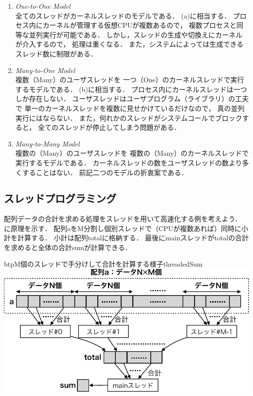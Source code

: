 \begin{enumerate}
\item \emph{One-to-One Model} \\
  全てのスレッドがカーネルスレッドのモデルである．
  (a)に相当する．
  プロセス内にカーネルが管理する仮想CPUが複数あるので，
  複数プロセスと同等な並列実行が可能である．
  しかし，スレッドの生成や切換えにカーネルが介入するので，
  処理は重くなる．
  また，システムによっては生成できるスレッド数に制限がある．
\item \emph{Many-to-One Model} \\
  複数（Many）のユーザスレッドを
  一つ（One）のカーネルスレッドで実行するモデルである．
  (b)に相当する．
  プロセス内にカーネルスレッドは一つしか存在しない．
  ユーザスレッドはユーザプログラム（ライブラリ）の工夫で
  単一のカーネルスレッドを複数に見せかけているだけなので，
  真の並列実行にはならない．
  また，何れかのスレッドがシステムコールでブロックすると，
  全てのスレッドが停止してしまう問題がある．
\item \emph{Many-to-Many Model} \\
  複数の（Many）のユーザスレッドを
  複数の（Many）のカーネルスレッドで実行するモデルである．
  カーネルスレッドの数をユーザスレッドの数より多くすることはない．
  前記二つのモデルの折衷案である．
\end{enumerate}

\subsection{スレッドプログラミング}
配列データの合計を求める処理をスレッドを用いて高速化する例を考えよう．
に原理を示す．
配列aをM分割し個別スレッドで（CPUが複数あれば）同時に小計を計算する．
小計は配列totalに格納する．
最後にmainスレッドがtotalの合計を求めると全体の合計sumが計算できる．

\begin{myfig}{btp}{M個のスレッドで手分けして合計を計算する様子}{threadedSum}
  \includegraphics[scale=0.66]{Fig/threadedSum-crop.pdf}
\end{myfig}

